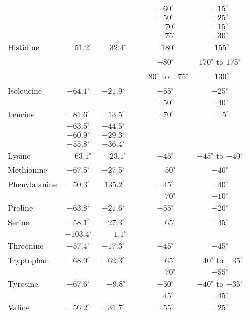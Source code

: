 \documentclass[12pt]{article}
\begin{document}
\begin{center}
\begin{tabular}{lccccc}
                 &      &       & & $-60^{\circ}$ & $-15^{\circ}$\\
                 &      &       & & $-50^{\circ}$ & $-25^{\circ}$\\
                 &      &       & & $\phantom{-}70^{\circ}$ & $-15^{\circ}$\\
                 &      &       & & $\phantom{-}75^{\circ}$ & $-30^{\circ}$\\
Histidine        & $\phantom{-}51.2^{\circ}$ & $\phantom{-}32.4^{\circ}$ & & $-180^{\circ}$ & ~$155^{\circ}$  \\
		 &	 &	& & $-80^{\circ}$ & $170^{\circ}$ to $175^{\circ}$ \\
                 &       &      & & $-80^{\circ}$ to $-75^{\circ}$ & ~$130^{\circ}$ \\
Isoleucine      & $-64.1^{\circ}$ & $-21.9^{\circ}$ & & $-55^{\circ}$ & $-25^{\circ}$ \\
		&	&	& & $-50^{\circ}$ & $-40^{\circ}$ \\
Leucine         & $-81.6^{\circ}$ & $-13.5^{\circ}$ & & $-70^{\circ}$ &  ~\,$-5^{\circ}$  \\
                & $-63.5^{\circ}$ & $-44.5^{\circ}$ & & & \\
                & $-60.9^{\circ}$ & $-29.3^{\circ}$ & & & \\
                & $-55.8^{\circ}$ & $-36.4^{\circ}$ & & & \\     
Lysine          & $\phantom{-}63.1^{\circ}$ & $\phantom{-}23.1^{\circ}$ & & $-45^{\circ}$ & $-45^{\circ}$ to $-40^{\circ}$ \\
Methionine      & $-67.5^{\circ}$ & $-27.5^{\circ}$ & & $\phantom{-}50^{\circ}$ & $-40^{\circ}$  \\
Phenylalanine   & $-50.3^{\circ}$ & \,\,$135.2^{\circ}$ & & $-45^{\circ}$ & $-40^{\circ}$  \\
                &       &       & & $\phantom{-}70^{\circ}$ & $-10^{\circ}$ \\
Proline         &  $-63.8^{\circ}$ & $-21.6^{\circ}$ & & $-55^{\circ}$ & $-20^{\circ}$  \\
Serine          & $-58.1^{\circ}$ & $-27.3^{\circ}$ & & $\phantom{-}65^{\circ}$ & $-45^{\circ}$ \\
		& $-103.4^{\circ}$ & $\phantom{-}\phantom{0}1.1^{\circ}$ & & & \\
Threonine       & $-57.4^{\circ}$ & $-17.3^{\circ}$ & & $-45^{\circ}$ & $-45^{\circ}$  \\
Tryptophan      & $-68.0^{\circ}$ & $-62.3^{\circ}$ & & $\phantom{-}65^{\circ}$ & $-40^{\circ}$ to $-35^{\circ}$  \\
		&       &       & & $\phantom{-}70^{\circ}$ & $-55^{\circ}$  \\
Tyrosine        & $-67.6^{\circ}$ & ~\,$-9.8^{\circ}$ & & $-50^{\circ}$ & $-40^{\circ}$ to $-35^{\circ}$ \\
                &       &       & & $-45^{\circ}$ & $-45^{\circ}$ \\
Valine          & $-56.2^{\circ}$ & $-31.7^{\circ}$ & & $-55^{\circ}$ & $-25^{\circ}$  \\
\hline
\end{tabular}
\end{center}
\end{document}
